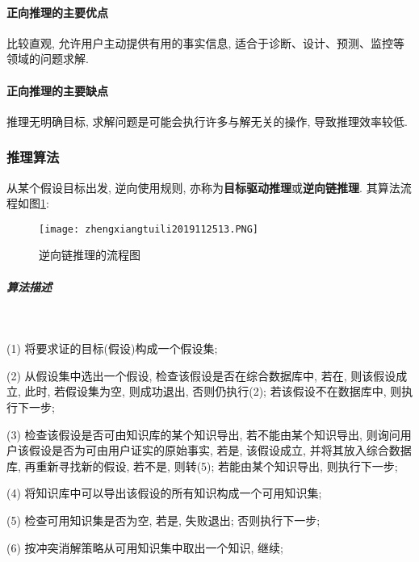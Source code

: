 \paragraph{正向推理的主要优点}
比较直观, 允许用户主动提供有用的事实信息, 适合于诊断、设计、预测、监控等领域的问题求解.
\paragraph{正向推理的主要缺点}
推理无明确目标, 求解问题是可能会执行许多与解无关的操作, 导致推理效率较低.
\subsubsection{推理算法}

从某个假设目标出发, 逆向使用规则, 亦称为\textbf{目标驱动推理}或\textbf{逆向链推理}.
其算法流程如图\ref{AI32fig13}:
\begin{figure}[H]
\centering
\texttt{[image: zhengxiangtuili2019112513.PNG]}
\caption{逆向链推理的流程图}
\label{AI32fig13}
\end{figure}
\subparagraph{算法描述}~{}

(1) 将要求证的目标(假设)构成一个假设集;

(2) 从假设集中选出一个假设, 检查该假设是否在综合数据库中, 若在, 则该假设成立, 此时, 若假设集为空, 则成功退出, 否则仍执行(2); 若该假设不在数据库中, 则执行下一步;

(3) 检查该假设是否可由知识库的某个知识导出, 若不能由某个知识导出, 则询问用户该假设是否为可由用户证实的原始事实, 若是, 该假设成立, 并将其放入综合数据库, 再重新寻找新的假设, 若不是, 则转(5); 若能由某个知识导出, 则执行下一步;

(4) 将知识库中可以导出该假设的所有知识构成一个可用知识集;

(5) 检查可用知识集是否为空, 若是, 失败退出; 否则执行下一步;

(6) 按冲突消解策略从可用知识集中取出一个知识, 继续;

